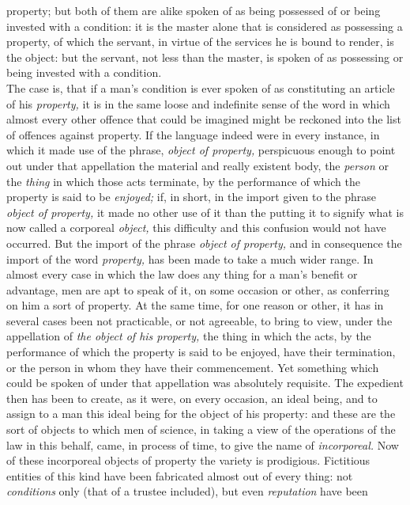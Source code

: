 \documentclass[12pt]{report}
\begin{document}
property; but both of them are alike spoken of as being possessed of or
being invested with a condition: it is the master alone that is
considered as possessing a property, of which the servant, in virtue of
the services he is bound to render, is the object: but the servant, not
less than the master, is spoken of as possessing or being invested with
a condition.\\
The case is, that if a man's condition is ever spoken of as constituting
an article of his \emph{property,} it is in the same loose and
indefinite sense of the word in which almost every other offence that
could be imagined might be reckoned into the list of offences against
property. If the language indeed were in every instance, in which it
made use of the phrase, \emph{object of property,} perspicuous enough to
point out under that appellation the material and really existent body,
the \emph{person} or the \emph{thing} in which those acts terminate, by
the performance of which the property is said to be \emph{enjoyed;} if,
in short, in the import given to the phrase \emph{object of property,}
it made no other use of it than the putting it to signify what is now
called a corporeal \emph{object,} this difficulty and this confusion
would not have occurred. But the import of the phrase \emph{object of
property,} and in consequence the import of the word \emph{property,}
has been made to take a much wider range. In almost every case in which
the law does any thing for a man's benefit or advantage, men are apt to
speak of it, on some occasion or other, as conferring on him a sort of
property. At the same time, for one reason or other, it has in several
cases been not practicable, or not agreeable, to bring to view, under
the appellation of \emph{the object of his property,} the thing in which
the acts, by the performance of which the property is said to be
enjoyed, have their termination, or the person in whom they have their
commencement. Yet something which could be spoken of under that
appellation was absolutely requisite. The expedient then has been to
create, as it were, on every occasion, an ideal being, and to assign to
a man this ideal being for the object of his property: and these are the
sort of objects to which men of science, in taking a view of the
operations of the law in this behalf, came, in process of time, to give
the name of \emph{incorporeal.} Now of these incorporeal objects of
property the variety is prodigious. Fictitious entities of this kind
have been fabricated almost out of every thing: not \emph{conditions}
only (that of a trustee included), but even \emph{reputation} have been
\end{document}

